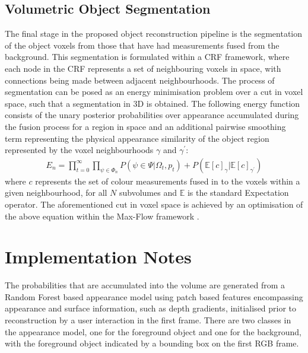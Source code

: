 \subsection{Volumetric Object Segmentation}
\label{subsec:shapeoptimisation}
The final stage in the proposed object reconstruction pipeline is the segmentation of the object voxels from those that have had measurements fused 
from the background. This segmentation is formulated within a CRF framework, where each node in the CRF represents a set of neighbouring voxels in space, 
with connections being made between adjacent neighbourhoods. The process of segmentation can be posed as an energy minimisation problem over a cut in voxel space, 
such that a segmentation in 3D is obtained. The following energy function consists of the unary posterior probabilities over appearance accumulated during the fusion 
process for a region in space and an additional pairwise smoothing term representing the physical appearance similarity of the object region represented by the voxel 
neighbourhoods $\gamma$ and $\gamma^{'}$:
\begin{equation}
\begin{split}
E_{n} = \prod_{t=0}^{\infty} \prod_{\psi \in \Phi_{n}} P(\psi \in \Psi | \Omega_{t}, p_{t}) + P(\mathbb{E}[c]_{\gamma} | \mathbb{E}[c]_{\gamma^{'}})
\end{split}
\end{equation}
where $c$ represents the set of colour measurements fused in to the voxels within a given neighbourhood, for all $N$ subvolumes and $\mathbb{E}$ is the standard Expectation operator.
The aforementioned cut in voxel space is achieved by an optimisation of the above equation within the Max-Flow framework \cite{BoykovKolmogorov}. 

\iffalse
\section{Implementation Notes}
The probabilities that are accumulated into the volume are generated from a Random Forest based appearance model using patch based features encompassing 
appearance and surface information, such as depth gradients, initialised prior to reconstruction by a user interaction in the first frame. There are two 
classes in the appearance model, one for the foreground object and one for the background, with the foreground object indicated by a bounding box on the 
first RGB frame.

